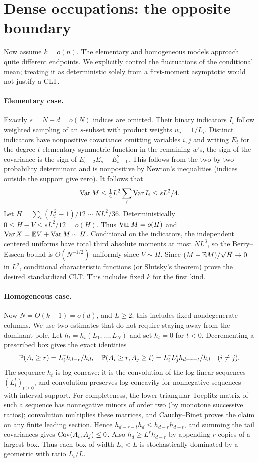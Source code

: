 \documentclass[11pt]{article}
\begin{document}
\section{Dense occupations: the opposite boundary}
Now assume $k=o(n)$. The elementary and homogeneous models approach quite different endpoints. We explicitly control the fluctuations of the conditional mean; treating it as deterministic solely from a first-moment asymptotic would not justify a CLT.
\paragraph{Elementary case.} Exactly $s=N-d=o(N)$ indices are omitted. Their binary indicators $I_i$ follow weighted sampling of an $s$-subset with product weights $w_i=1/L_i$. Distinct indicators have nonpositive covariance: omitting variables $i,j$ and writing $E_t$ for the degree-$t$ elementary symmetric function in the remaining $w$'s, the sign of the covariance is the sign of $E_{s-2}E_s-E_{s-1}^2$. This follows from the two-by-two probability determinant and is nonpositive by Newton's inequalities (indices outside the support give zero). It follows that
\[
\operatorname{Var} M\le\tfrac14 L^2\sum_i\operatorname{Var} I_i\le sL^2/4 .
\]
Let $H=\sum_i(L_i^2-1)/12\sim NL^2/36$. Deterministically $0\le H-V\le sL^2/12=o(H)$. Thus $\operatorname{Var} M=o(H)$ and $\operatorname{Var} X=\mathbb E V+\operatorname{Var} M\sim H$. Conditional on the indicators, the independent centered uniforms have total third absolute moments at most $NL^3$, so the Berry--Esseen bound is $O(N^{-1/2})$ uniformly since $V\sim H$. Since $(M-\mathbb E M)/\sqrt H\to0$ in $L^2$, conditional characteristic functions (or Slutsky's theorem) prove the desired standardized CLT. This includes fixed $k$ for the first kind.
\paragraph{Homogeneous case.} Now $N=O(k+1)=o(d)$, and $L\ge2$; this includes fixed nondegenerate columns. We use two estimates that do not require staying away from the dominant pole. Let $h_t=h_t(L_1,\ldots,L_N)$ and set $h_t=0$ for $t<0$. Decrementing a prescribed box gives the exact identities
\[
\mathbb P(A_i\ge r)=L_i^r h_{d-r}/h_d,\quad
\mathbb P(A_i\ge r,A_j\ge t)=L_i^rL_j^t h_{d-r-t}/h_d\quad(i\ne j).
\]
The sequence $h_t$ is log-concave: it is the convolution of the log-linear sequences $(L_i^t)_{t\ge0}$, and convolution preserves log-concavity for nonnegative sequences with interval support. For completeness, the lower-triangular Toeplitz matrix of such a sequence has nonnegative minors of order two (by monotone successive ratios); convolution multiplies these matrices, and Cauchy--Binet proves the claim on any finite leading section. Hence $h_{d-r-t}h_d\le h_{d-r}h_{d-t}$, and summing the tail covariances gives $\operatorname{Cov}(A_i,A_j)\le0$. Also $h_d\ge L^r h_{d-r}$ by appending $r$ copies of a largest box. Thus each box of width $L_i<L$ is stochastically dominated by a geometric with ratio $L_i/L$.
 
\end{document}

